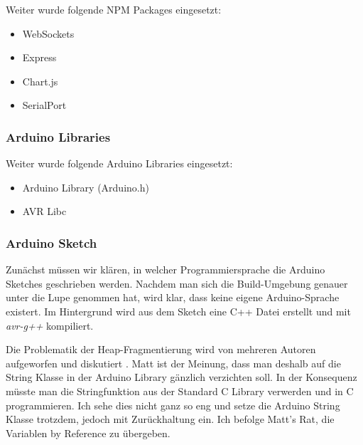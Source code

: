 Weiter wurde folgende NPM Packages eingesetzt:

\begin{itemize}
\item
  WebSockets \autocite{websockets}
\item
  Express \autocite{express}
\item
  Chart.js \autocite{chartjs}
\item
  SerialPort \autocite{serialPort}
\end{itemize}

\hypertarget{arduino-libraries}{%
\subsubsection{Arduino Libraries}\label{arduino-libraries}}

Weiter wurde folgende Arduino Libraries eingesetzt:

\begin{itemize}
\item
  Arduino Library (Arduino.h)
  \autocite{sprachreferenz}\autocite{codeReferenz}\autocite{arduinoCheatSheet}
\item
  AVR Libc \autocite{avrlibc}
\end{itemize}

\hypertarget{arduino-sketch}{%
\subsubsection{Arduino Sketch}\label{arduino-sketch}}

Zunächst müssen wir klären, in welcher Programmiersprache die Arduino
Sketches geschrieben werden. Nachdem man sich die Build-Umgebung genauer
unter die Lupe genommen hat, wird klar, dass keine eigene
Arduino-Sprache existert\autocite{arduinoLanguage}. Im Hintergrund wird
aus dem Sketch eine C++ Datei erstellt und mit \emph{avr-g++}
kompiliert.

Die Problematik der Heap-Fragmentierung wird von mehreren Autoren
aufgeworfen und diskutiert \autocite{heapFragmentation}
\autocite{heapFragmentation2}. Matt ist der Meinung, dass man deshalb
auf die String Klasse in der Arduino Library gänzlich verzichten
soll\autocite{arduinoStrings}. In der Konsequenz müsste man die
Stringfunktion aus der Standard C Library\autocite{avrlibc} verwerden
und in C programmieren. Ich sehe dies nicht ganz so eng und setze die
Arduino String Klasse trotzdem, jedoch mit Zurückhaltung ein. Ich
befolge Matt's Rat, die Variablen by Reference zu
übergeben\autocite{arduinoStrings}.

